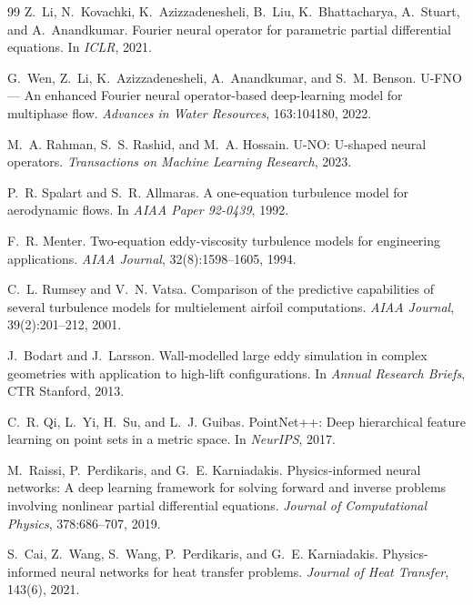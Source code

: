 \documentclass[10pt,twocolumn,letterpaper]{article}
\begin{document}
{\begin{thebibliography}{99}
Z.~Li, N.~Kovachki, K.~Azizzadenesheli, B.~Liu, K.~Bhattacharya,
  A.~Stuart, and A.~Anandkumar.
\newblock Fourier neural operator for parametric partial differential
  equations.
\newblock In \emph{ICLR}, 2021.

G.~Wen, Z.~Li, K.~Azizzadenesheli, A.~Anandkumar, and S.~M. Benson.
\newblock U-{FNO} --- An enhanced {Fourier} neural operator-based deep-learning
  model for multiphase flow.
\newblock \emph{Advances in Water Resources}, 163:104180, 2022.

M.~A. Rahman, S.~S. Rashid, and M.~A. Hossain.
\newblock U-{NO}: U-shaped neural operators.
\newblock \emph{Transactions on Machine Learning Research}, 2023.

P.~R. Spalart and S.~R. Allmaras.
\newblock A one-equation turbulence model for aerodynamic flows.
\newblock In \emph{AIAA Paper 92-0439}, 1992.

F.~R. Menter.
\newblock Two-equation eddy-viscosity turbulence models for engineering
  applications.
\newblock \emph{AIAA Journal}, 32(8):1598--1605, 1994.

C.~L. Rumsey and V.~N. Vatsa.
\newblock Comparison of the predictive capabilities of several turbulence
  models for multielement airfoil computations.
\newblock \emph{AIAA Journal}, 39(2):201--212, 2001.

J.~Bodart and J.~Larsson.
\newblock Wall-modelled large eddy simulation in complex geometries with
  application to high-lift configurations.
\newblock In \emph{Annual Research Briefs}, CTR Stanford, 2013.

C.~R. Qi, L.~Yi, H.~Su, and L.~J. Guibas.
\newblock PointNet++: Deep hierarchical feature learning on point sets in a
  metric space.
\newblock In \emph{NeurIPS}, 2017.

M.~Raissi, P.~Perdikaris, and G.~E. Karniadakis.
\newblock Physics-informed neural networks: A deep learning framework for
  solving forward and inverse problems involving nonlinear partial
  differential equations.
\newblock \emph{Journal of Computational Physics}, 378:686--707, 2019.

S.~Cai, Z.~Wang, S.~Wang, P.~Perdikaris, and G.~E. Karniadakis.
\newblock Physics-informed neural networks for heat transfer problems.
\newblock \emph{Journal of Heat Transfer}, 143(6), 2021.


\end{thebibliography}}
\end{document}
